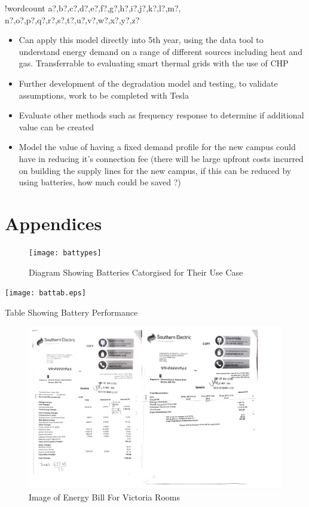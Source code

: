 \documentclass[fontsize=9.5pt]{extarticle}
\numberwithin{figure}{section} %
\providecommand{\tightlist}{%
  \setlength{\itemsep}{0pt}\setlength{\parskip}{0pt}}
\newcounter{words}
\newenvironment{counted}{%
  \setcounter{words}{0}
  \SearchList!{wordcount}{\stepcounter{words}}
    {a?,b?,c?,d?,e?,f?,g?,h?,i?,j?,k?,l?,m?,
    n?,o?,p?,q?,r?,s?,t?,u?,v?,w?,x?,y?,z?}
  \UndoBoundary{'}
  \SearchOrder{p;}}{%
  \StopSearching}
\begin{document}
\begin{counted}
\begin{itemize}
\tightlist
\item
  Can apply this model directly into 5th year, using the data tool to
  understand energy demand on a range of different sources including
  heat and gas. Transferrable to evaluating smart thermal grids with the
  use of CHP
\item
  Further development of the degradation model and testing, to validate
  assumptions, work to be completed with Tesla
\item
  Evaluate other methods such as frequency response to determine if
  additional value can be created
\item
  Model the value of having a fixed demand profile for the new campus
  could have in reducing it's connection fee (there will be large
  upfront costs incurred on building the supply lines for the new
  campus, if this can be reduced by using batteries, how much could be
  saved ?)
\end{itemize}

\newpage

\section{Appendices}

\begin{figure}[H]
\centering
\texttt{[image: battypes]}
\caption{Diagram Showing Batteries Catorgised for Their Use Case \cite{Dunn928}}
\label{battypes}
\end{figure}

\begin{landscape}

\begin{table}[H]
\centering
\texttt{[image: battab.eps]}
\caption{Table Showing Battery Performance}
\label{battabs}
\end{table}

\newpage

\begin{figure}[H]
 \centering
 \includegraphics[trim = 0 0 0 0, clip, width=1.3\textwidth]{Development-38.png}
 \caption{Image of Energy Bill For Victoria Rooms}
 \label{Development-38}
 \end{figure}


\end{landscape}
\end{counted}
\end{document}
